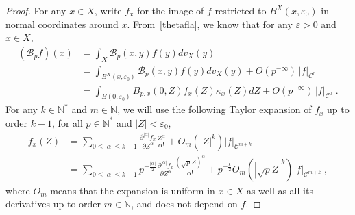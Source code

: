 \documentclass[11pt]{article}
\theoremstyle{definition}
\numberwithin{equation}{section}
\numberwithin{figure}{section}
\numberwithin{table}{section}
\newcommand{\N}{{\mathbb{N}}}
\newcommand{\cB}{{\mathcal{B}}}
\renewcommand\leq {\leqslant}
\newcommand\< {\mathcal{h}}
\renewcommand\> {\mathcal{i}}
\renewcommand{\epsilon}{\varepsilon}
\newcommand*\cC{\mathscr{C}}
\begin{document}
\begin{proof}
For any $x\in X$, write $f_x$ for the image of $f$ restricted to $B^X(x,\epsilon_0)$ in normal coordinates around $x$. From~\eqref{thetafla}, we know that for any $\epsilon>0$ and $x\in X$,
\begin{equation}\label{KStheta}
\begin{split}
(\cB_pf)(x)&=\int_X \cB_p(x,y)f(y)dv_X(y)\\
&=\int_{B^X(x,\epsilon_0)}\cB_p(x,y)f(y)dv_X(y) +O(p^{-\infty})\,|f|_{\cC^0}\\
&=\int_{B(0,\epsilon_0)}B_{p,x}(0,Z)f_x(Z)\kappa_x(Z)dZ +O(p^{-\infty})\,|f|_{\cC^0}\;.
\end{split}
\end{equation}
For any $k\in\N^*$ and $m\in\N$, we will use the following Taylor expansion of $f_x$ up to order $k-1$, for all $p\in\N^*$ and $|Z|<\epsilon_0$,
\begin{equation}\label{Taylorfk}
\begin{split}
f_{x}(Z) &=\sum_{0\leq|\alpha|\leq k-1}\frac{\partial^{|\alpha|} f_{x}}{\partial Z^\alpha}\frac{Z^\alpha}{\alpha!} +O_m(|Z|^{k})|f|_{\cC^{m+k}}\\
&=\sum_{0\leq |\alpha|\leq k-1}p^{-\frac{|\alpha|}{2}}\frac{\partial^{|\alpha|} f_{x}}{\partial Z^\alpha}\frac{(\sqrt{p}Z)^\alpha}{\alpha!}+p^{-\frac{k}{2}}O_m(|\sqrt{p}Z|^{k})|f|_{\cC^{m+k}}\;,
\end{split}
\end{equation}
where $O_m$ means that the expansion is uniform in $x\in X$ as well as all its derivatives up to order $m\in\N$, and does not depend on $f$.


\end{proof}
\end{document}
